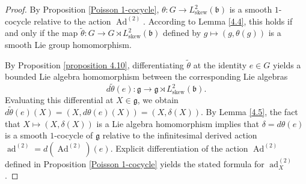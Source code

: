 \documentclass[11pt,reqno]{amsart}
\theoremstyle{definition}
\numberwithin{equation}{section}
\begin{document}
\begin{proof}
By Proposition \ref{Poisson 1-cocycle}, $\theta: G \rightarrow L^2_{\text{skew}}(\mathfrak{b})$ is a smooth $1$-cocycle relative to the action $\operatorname{Ad}^{(2)}$. According to Lemma \ref{4.4}, this holds if and only if the map $\tilde{\theta}: G \rightarrow G \rtimes L^2_{\text{skew}}(\mathfrak{b})$ defined by $g \mapsto (g, \theta(g))$ is a smooth Lie group homomorphism.

By Proposition \ref{proposition 4.10}, differentiating $\tilde{\theta}$ at the identity $e \in G$ yields a bounded Lie algebra homomorphism between the corresponding Lie algebras
\[
d\tilde{\theta}(e): \mathfrak{g} \rightarrow \mathfrak{g} \rtimes L^2_{\text{skew}}(\mathfrak{b}).
\]
Evaluating this differential at $X \in \mathfrak{g}$, we obtain $d\tilde{\theta}(e)(X) = (X, d\theta(e)(X)) = (X, \delta(X))$. By Lemma \ref{4.5}, the fact that $X \mapsto (X, \delta(X))$ is a Lie algebra homomorphism implies that $\delta = d\theta(e)$ is a smooth $1$-cocycle of $\mathfrak{g}$ relative to the infinitesimal derived action $\operatorname{ad}^{(2)} = d(\operatorname{Ad}^{(2)})(e)$. Explicit differentiation of the action $\operatorname{Ad}^{(2)}$ defined in Proposition \ref{Poisson 1-cocycle} yields the stated formula for $\operatorname{ad}^{(2)}_X$.


\end{proof}
\end{document}

